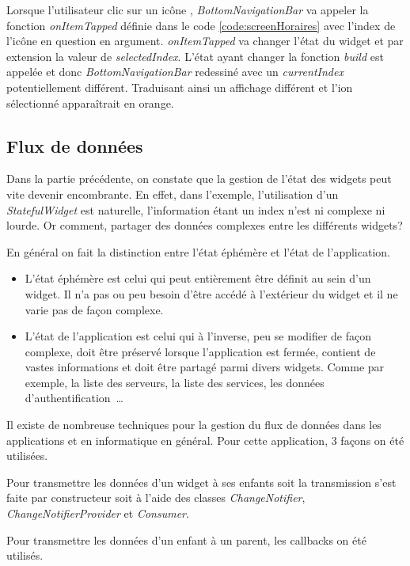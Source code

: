 Lorsque l'utilisateur clic sur un icône , \textit{BottomNavigationBar} va appeler la fonction \textit{onItemTapped} définie dans le code \ref{code:screenHoraires} avec
l'index de l'icône en question en argument. \textit{onItemTapped} va changer l'état du widget et par extension la valeur de \textit{selectedIndex}. L'état ayant changer la fonction
\textit{build} est appelée et donc \textit{BottomNavigationBar} redessiné avec un \textit{currentIndex} potentiellement différent. Traduisant ainsi
un affichage différent et l'ion sélectionné apparaîtrait en orange.

\subsection{Flux de données}
Dans la partie précédente, on constate que la gestion de l'état des widgets peut vite devenir encombrante. En effet, dans l'exemple,
l'utilisation d'un \textit{StatefulWidget} est naturelle, l'information étant un index n'est ni complexe ni lourde. Or comment, partager des
données complexes entre les différents widgets?

En général on fait la distinction entre l'état éphémère et l'état de l'application.
\smallskip
\begin{itemize}
    \item L'état éphémère est celui qui peut entièrement être définit au sein d'un widget. Il n'a pas ou peu besoin d'être
          accédé à l'extérieur du widget et il ne varie pas de façon complexe.
    \item L'état de l'application est celui qui à l'inverse, peu se modifier de façon complexe, doit être préservé lorsque l'application est fermée,
          contient de vastes informations et doit être partagé parmi divers widgets. Comme par exemple, la liste des serveurs, la liste des services, les
          données d'authentification~\dots
\end{itemize}

Il existe de nombreuse techniques pour la gestion du flux de données dans les applications et en informatique en général. Pour cette application, 3 façons
on été utilisées.

Pour transmettre les données d'un widget à ses enfants soit la transmission s'est faite par constructeur soit à l'aide des classes \textit{ChangeNotifier}, \textit{ChangeNotifierProvider} et \textit{Consumer}.

Pour transmettre les données d'un enfant à un parent, les callbacks on été utilisés.

